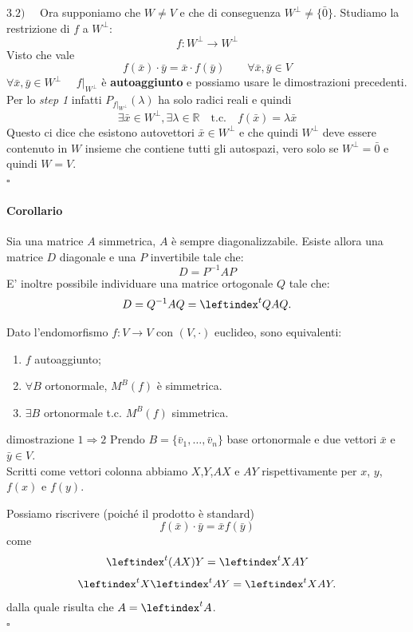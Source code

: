 \documentclass[x11names]{article}
\newcommand*{\QEDB}{\null\nobreak\hfill\ensuremath{\square}}%
\begin{document}
\begin{es}{}
$3.2) \quad$ Ora supponiamo che $W \neq V$ e che di conseguenza $W^\perp \neq \{\bar{0}\}$. Studiamo la restrizione di $f$ a $W^\perp$:
\[
f: W^\perp \to W^\perp 
\]
Visto che vale
\[
f(\bar{x}) \cdot \bar{y} =  \bar{x}  \cdot f(\bar{y})  \qquad \forall \bar{x},\bar{y} \in V
\]
$\forall\bar{x},\bar{y} \in W^\perp \quad$ $f|_{W^\perp}$ è \textbf{autoaggiunto} e possiamo usare le dimostrazioni precedenti. Per lo \textit{step 1} infatti $P_{f|_{W^\perp}}(\lambda)$ ha solo radici reali e quindi
\[
\exists \bar{x} \in W^\perp, \exists \lambda \in \mathbb{R} \quad \text{t.c.} \quad f(\bar{x}) = \lambda \bar{x}
\]
Questo ci dice che esistono autovettori $\bar{x} \in W^\perp$ e che quindi $W^\perp$ deve essere contenuto in $W$ insieme che contiene tutti gli autospazi, vero solo se $W^\perp = {\bar{0}}$ e quindi $W = V$.
\\
\QEDB
\end{es}



\paragraph{Corollario}
Sia una matrice $A$ simmetrica, $A$ è sempre diagonalizzabile. Esiste allora una matrice  $D$ diagonale e una $P$ invertibile tale che:
 \[
D = P^{-1}AP
\] 
E' inoltre possibile individuare una matrice ortogonale $Q$ tale che:
\[
D = Q^{-1}AQ = \leftindex^t{Q}AQ
.\] 


Dato l'endomorfismo $f: V \longrightarrow V$ con  $\left(V,\cdot\right)$ euclideo, sono equivalenti:

\begin{enumerate}
	\item $f$ autoaggiunto;
	\item $\forall B$ ortonormale, $M^B\left(f\right)$ è simmetrica.
	\item $\exists B$ ortonormale t.c. $M^B\left(f\right)$ simmetrica.
\end{enumerate}

\begin{es}{dimostrazione $1\Rightarrow 2$}
	Prendo $B = \{\bar{v}_{1},\dots,\bar{v}_{n}\}$ base ortonormale e due vettori $\bar{x}$ e $\bar{y} \in V$.\\
	
	Scritti come vettori colonna abbiamo $X$,$Y$,$AX$ e  $AY$ rispettivamente per  $x$,  $y$,  $f\left(x\right)$ e $f\left(y\right)$. 
	
	Possiamo riscrivere (poiché il prodotto è standard)
	\[
	f\left(\bar{x}\right)\cdot \bar{y} = \bar{x}f\left(\bar{y}\right)
	\] 
	come 
	\[
	\leftindex^t{\left(AX\right)}Y = \leftindex^t{X}AY
	\] 
	\[
	\leftindex^t{X}\leftindex^t{A}Y = \leftindex^t{X}AY
	.\] 
	dalla quale risulta che $A = \leftindex^t{A}$.
	\\
	\QEDB
\end{es}
\end{document}
